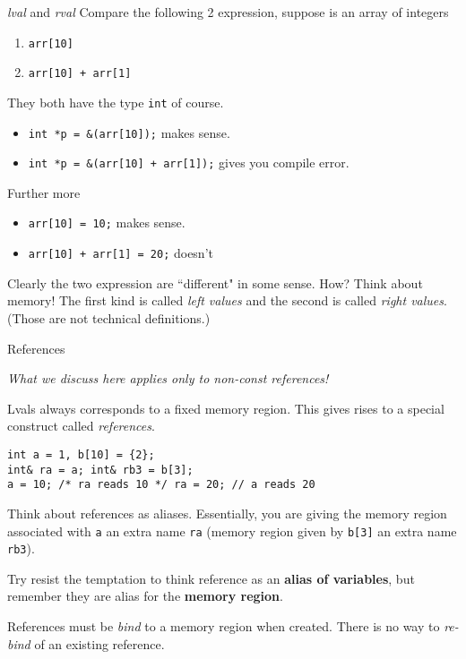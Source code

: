 \begin{frame}[fragile]{\textit{lval} and \textit{rval}}
Compare the following 2 expression, suppose  is an array of integers
\begin{enumerate}
	\item \texttt{arr[10]}
	\item \texttt{arr[10] + arr[1]}
\end{enumerate}
They both have the type \texttt{int} of course. 
\begin{itemize}
	\item \texttt{int *p = &(arr[10]);} makes sense.
	\item \texttt{int *p = &(arr[10] + arr[1]);} gives you compile error.
\end{itemize}  
Further more
\begin{itemize}
	\item \texttt{arr[10] = 10;} makes sense.
	\item \texttt{arr[10] + arr[1] = 20;} doesn't
\end{itemize} 
Clearly the two expression are ``different" in some sense. How? Think about memory! The first kind is called \textit{left values} and the second is called \textit{right values}. (Those are not technical definitions.)
\end{frame}

\begin{frame}[fragile]{References}

\textit{What we discuss here applies only to non-const references!}

Lvals always corresponds to a fixed memory region. This gives rises to a special construct called \textit{references}. 

\begin{verbatim}
int a = 1, b[10] = {2};
int& ra = a; int& rb3 = b[3];
a = 10; /* ra reads 10 */ ra = 20; // a reads 20
\end{verbatim}

Think about references as aliases. Essentially, you are giving the memory region associated with \texttt{a} an extra name \texttt{ra} (memory region given by \texttt{b[3]} an extra name \texttt{rb3}). 

Try resist the temptation to think reference as an \textbf{alias of variables}, but remember they are alias for the \textbf{memory region}.

References must be \textit{bind} to a memory region when created. There is no way to \textit{re-bind} of an existing reference. 
\end{frame}

